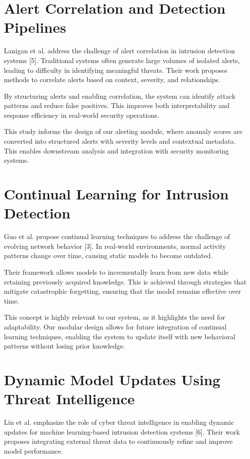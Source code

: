 \section{Alert Correlation and Detection Pipelines}
Lanigan et al. address the challenge of alert correlation in intrusion detection
systems [5]. Traditional systems often generate large volumes of isolated alerts,
leading to difficulty in identifying meaningful threats. Their work proposes
methods to correlate alerts based on context, severity, and relationships.

By structuring alerts and enabling correlation, the system can identify attack
patterns and reduce false positives. This improves both interpretability and
response efficiency in real-world security operations.

This study informs the design of our alerting module, where anomaly scores are
converted into structured alerts with severity levels and contextual metadata.
This enables downstream analysis and integration with security monitoring
systems.

\section{Continual Learning for Intrusion Detection}
Guo et al. propose continual learning techniques to address the challenge of
evolving network behavior [3]. In real-world environments, normal activity
patterns change over time, causing static models to become outdated.

Their framework allows models to incrementally learn from new data while
retaining previously acquired knowledge. This is achieved through strategies that
mitigate catastrophic forgetting, ensuring that the model remains effective over
time.

This concept is highly relevant to our system, as it highlights the need for
adaptability. Our modular design allows for future integration of continual
learning techniques, enabling the system to update itself with new behavioral
patterns without losing prior knowledge.

\section{Dynamic Model Updates Using Threat Intelligence}
Lin et al. emphasize the role of cyber threat intelligence in enabling dynamic
updates for machine learning-based intrusion detection systems [6]. Their work
proposes integrating external threat data to continuously refine and improve
model performance.

